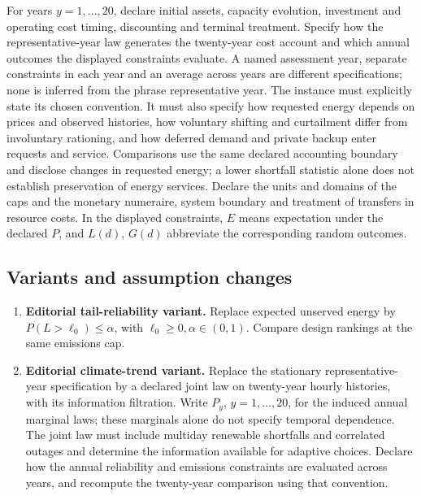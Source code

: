 \documentclass[11pt,a4paper]{article}
\begin{document}
For years \(y=1,\ldots,20\), declare initial assets, capacity evolution, investment and operating cost timing, discounting and terminal treatment. Specify how the representative-year law generates the twenty-year cost account and which annual outcomes the displayed constraints evaluate. A named assessment year, separate constraints in each year and an average across years are different specifications; none is inferred from the phrase representative year. The instance must explicitly state its chosen convention. It must also specify how requested energy depends on prices and observed histories, how voluntary shifting and curtailment differ from involuntary rationing, and how deferred demand and private backup enter requests and service. Comparisons use the same declared accounting boundary and disclose changes in requested energy; a lower shortfall statistic alone does not establish preservation of energy services. Declare the units and domains of the caps and the monetary numeraire, system boundary and treatment of transfers in resource costs. In the displayed constraints, \(E\) means expectation under the declared \(P\), and \(L(d)\), \(G(d)\) abbreviate the corresponding random outcomes.
\subsection*{Variants and assumption changes}
\begin{enumerate}
\item \textbf{Editorial tail-reliability variant.} Replace expected unserved energy by \(P(L>\ell_0)\leq\alpha\), with \(\ell_0\geq0,\alpha\in(0,1)\). Compare design rankings at the same emissions cap.
\item \textbf{Editorial climate-trend variant.} Replace the stationary representative-year specification by a declared joint law on twenty-year hourly histories, with its information filtration. Write \(P_y\), \(y=1,\ldots,20\), for the induced annual marginal laws; these marginals alone do not specify temporal dependence. The joint law must include multiday renewable shortfalls and correlated outages and determine the information available for adaptive choices. Declare how the annual reliability and emissions constraints are evaluated across years, and recompute the twenty-year comparison using that convention.
\end{enumerate}
\end{document}
